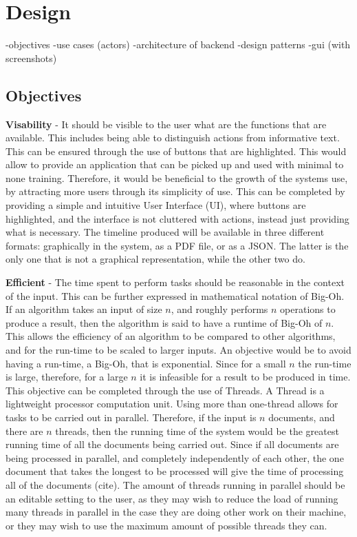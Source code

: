 \chapter{Design}
-objectives
-use cases (actors)
-architecture of backend
-design patterns
-gui (with screenshots)
\section{Objectives}
\par \textbf{Visability} -  It should be visible to the user what are the functions that are available. This includes being able to distinguish actions from informative text. This can be ensured through the use of buttons that are highlighted. This would allow to provide an application that can be picked up and used with minimal to none training. Therefore, it would be beneficial to the growth of the systems use, by attracting more users through its simplicity of use. This can be completed by providing a simple and intuitive User Interface (UI), where buttons are highlighted, and the interface is not cluttered with actions, instead just providing what is necessary. The timeline produced will be available in three different formats: graphically in the system, as a PDF file, or as a JSON. The latter is the only one that is not a graphical representation, while the other two do.
\par \textbf{Efficient} - The time spent to perform tasks should be reasonable in the context of the input. This can be further expressed in mathematical notation of Big-Oh. If an algorithm takes an input of size $n$, and roughly performs $n$ operations to produce a result, then the algorithm is said to have a runtime of Big-Oh of $n$. This allows the efficiency of an algorithm to be compared to other algorithms, and for the run-time to be scaled to larger inputs. An objective would be to avoid having a run-time, a Big-Oh, that is exponential. Since for a small $n$ the run-time is large, therefore, for a large $n$ it is infeasible for a result to be produced in time. This objective can be completed through the use of Threads. A Thread is a lightweight processor computation unit. Using more than one-thread allows for tasks to be carried out in parallel. Therefore, if the input is $n$ documents, and there are $n$ threads, then the running time of the system would be the greatest running time of all the documents being carried out. Since if all documents are being processed in parallel, and completely independently of each other, the one document that takes the longest to be processed will give the time of processing all of the documents (cite). The amount of threads running in parallel should be an editable setting to the user, as they may wish to reduce the load of running many threads in parallel in the case they are doing other work on their machine, or they may wish to use the maximum amount of possible threads they can.
